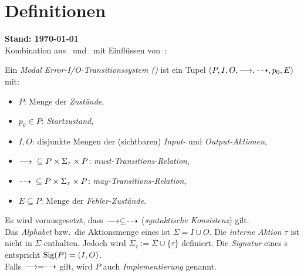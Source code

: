 \chapter{Definitionen}
{\large\textbf{Stand: \today{}}}\\

Kombination aus~\cite{Vogler2015FailSem} und~\cite{Schinko2016BA} mit
Einflüssen von~\cite{Vogler2016MIA3}:

\begin{Def}
  Ein \emph{Modal Error-I/O-Transitionssystem (\MEIO{})} ist ein Tupel
  $(P,I,O,\must,\may,p_0,E)$ mit:
  \begin{itemize}
    \item $P$: Menge der \emph{Zustände},
    \item $p_0\in P$: \emph{Startzustand},
    \item $I,O$: disjunkte Mengen der (sichtbaren) \emph{Input-} und
      \emph{Output-Aktionen},
    \item $\must{} \subseteq P\times \Sigma_{\tau}\times P$:
      \emph{must-Transitions-Relation},
    \item $\may{} \subseteq P\times \Sigma_{\tau}\times P$:
      \emph{may-Transitions-Relation},
    \item $E\subseteq P$: Menge der \emph{Fehler-Zustände}.
  \end{itemize}
  Es wird vorausgesetzt, dass $\must\subseteq\may$ (\emph{syntaktische
  Konsistenz}) gilt.\\
  Das \emph{Alphabet} bzw.\ die Aktionsmenge eines \MEIO{} ist $\Sigma = I\cup
  O$. Die \emph{interne Aktion} $\tau$ ist nicht in $\Sigma$ enthalten. Jedoch
  wird $\Sigma_{\tau} := \Sigma \cup \{\tau\}$ definiert. Die \emph{Signatur}
  eines \MEIO{}s entspricht $\mathrm{Sig} (P)=(I,O)$.\\
  Falls $\must =\may$ gilt, wird $P$ auch \emph{Implementierung} genannt.
\end{Def}


